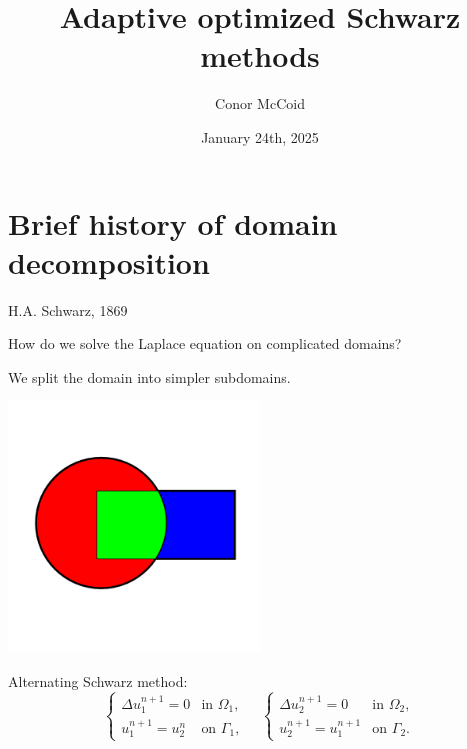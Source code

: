 \documentclass{beamer}
\title{Adaptive optimized Schwarz methods}
\author{Conor McCoid}
\institute{McMaster University}
\date{January 24th, 2025}
\begin{document}
\maketitle

\section{Brief history of domain decomposition} %

\begin{frame}{H.A. Schwarz, 1869}

How do we solve the Laplace equation on complicated domains?

We split the domain into simpler subdomains.

\begin{center}
\vspace{-3em}
\includegraphics[width=0.5\textwidth]{AOSM/FIG_keyhole.png}
\vspace{-4em}
\end{center}

Alternating Schwarz method:
\begin{equation*}
	\begin{cases} \Delta u_1^{n+1} = 0 & \text{in } \Omega_1, \\ u_1^{n+1} = u_2^n & \text{on } \Gamma_1, \end{cases}
	\quad
	\begin{cases} \Delta u_2^{n+1} = 0 & \text{in } \Omega_2, \\ u_2^{n+1} = u_1^{n+1} & \text{on } \Gamma_2. \end{cases}
\end{equation*}
\end{frame}
\end{document}
